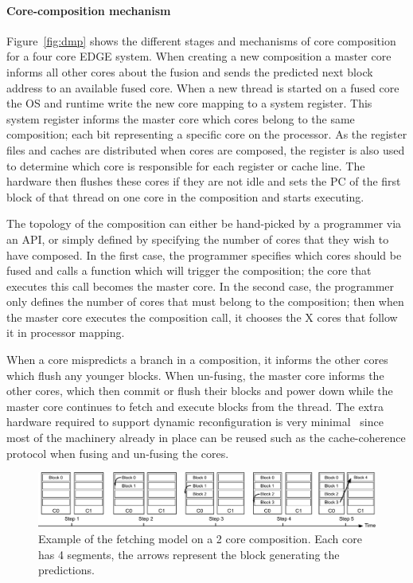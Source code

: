 \paragraph*{Core-composition mechanism}
Figure~\ref{fig:dmp} shows the different stages and mechanisms of core composition for a four core EDGE system.
When creating a new composition a master core informs all other cores about the fusion and sends the predicted next block address to an available fused core.
When a new thread is started on a fused core the OS and runtime write the new core mapping to a system register.
This system register informs the master core which cores belong to the same composition; each bit representing a specific core on the processor.
As the register files and caches are distributed when cores are composed, the register is also used to determine which core is responsible for each register or cache line.
The hardware then flushes these cores if they are not idle and sets the PC of the first block of that thread on one core in the composition and starts executing.

The topology of the composition can either be hand-picked by a programmer via an API, or simply defined by specifying the number of cores that they wish to have composed.
In the first case, the programmer specifies which cores should be fused and calls a function which will trigger the composition; the core that executes this call becomes the master core.
In the second case, the programmer only defines the number of cores that must belong to the composition; then when the master core executes the composition call, it chooses the X cores that follow it in processor mapping.

When a core mispredicts a branch in a composition, it informs the other cores which flush any younger blocks.
When un-fusing, the master core informs the other cores, which then commit or flush their blocks and power down while the master core continues to fetch and execute blocks from the thread.
The extra hardware required to support dynamic reconfiguration is very minimal~\cite{kim2007tflex} since most of the machinery already in place can be reused such as the cache-coherence protocol when fusing and un-fusing the cores.

\begin{figure}[t]
    \centering
    \includegraphics[width=1\textwidth]{chapter3/graphics/normfetch.pdf}
    \caption{Example of the fetching model on a 2 core composition. Each core has 4 segments, the arrows represent the block generating the predictions.}
   \label{fig:old_fetch}
\end{figure}

